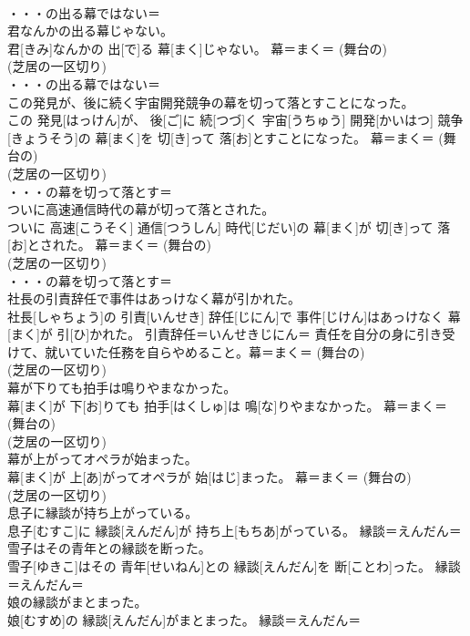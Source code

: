\documentclass[8pt]{extreport}
\begin{document}
\begin{CJK}{UTF8}{min}
{\\	・・・の出る幕ではない＝ 
\\	君なんかの出る幕じゃない。	
\\	君[きみ]なんかの 出[で]る 幕[まく]じゃない。	幕＝まく＝ (舞台の) 
\\	(芝居の一区切り) 
\\	・・・の出る幕ではない＝ 
\\	この発見が、後に続く宇宙開発競争の幕を切って落とすことになった。	
\\	この 発見[はっけん]が、 後[ご]に 続[つづ]く 宇宙[うちゅう] 開発[かいはつ] 競争[きょうそう]の 幕[まく]を 切[き]って 落[お]とすことになった。	幕＝まく＝ (舞台の) 
\\	(芝居の一区切り) 
\\	・・・の幕を切って落とす＝ 
\\	ついに高速通信時代の幕が切って落とされた。	
\\	ついに 高速[こうそく] 通信[つうしん] 時代[じだい]の 幕[まく]が 切[き]って 落[お]とされた。	幕＝まく＝ (舞台の) 
\\	(芝居の一区切り) 
\\	・・・の幕を切って落とす＝ 
\\	社長の引責辞任で事件はあっけなく幕が引かれた。	
\\	社長[しゃちょう]の 引責[いんせき] 辞任[じにん]で 事件[じけん]はあっけなく 幕[まく]が 引[ひ]かれた。	引責辞任＝いんせきじにん＝ 責任を自分の身に引き受けて、就いていた任務を自らやめること。幕＝まく＝ (舞台の) 
\\	(芝居の一区切り) 
\\	幕が下りても拍手は鳴りやまなかった。	
\\	幕[まく]が 下[お]りても 拍手[はくしゅ]は 鳴[な]りやまなかった。	幕＝まく＝ (舞台の) 
\\	(芝居の一区切り) 
\\	幕が上がってオペラが始まった。	
\\	幕[まく]が 上[あ]がってオペラが 始[はじ]まった。	幕＝まく＝ (舞台の) 
\\	(芝居の一区切り) 
\\	息子に縁談が持ち上がっている。	
\\	息子[むすこ]に 縁談[えんだん]が 持ち上[もちあ]がっている。	縁談＝えんだん＝ 
\\	雪子はその青年との縁談を断った。	
\\	雪子[ゆきこ]はその 青年[せいねん]との 縁談[えんだん]を 断[ことわ]った。	縁談＝えんだん＝ 
\\	娘の縁談がまとまった。	
\\	娘[むすめ]の 縁談[えんだん]がまとまった。	縁談＝えんだん＝ 
}
\end{CJK}
\end{document}
